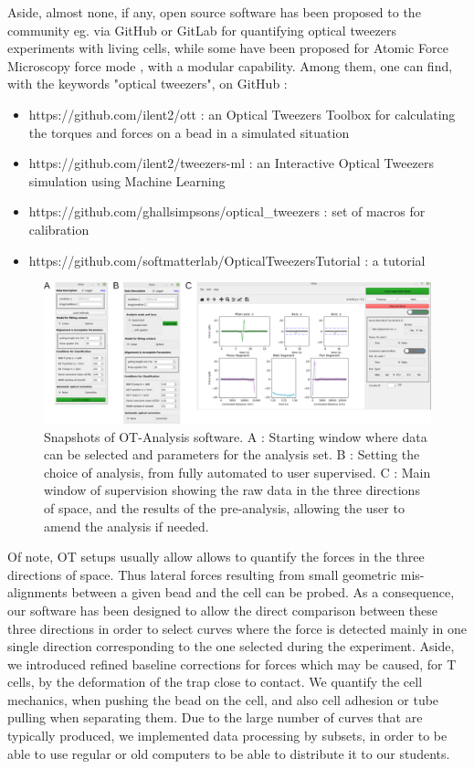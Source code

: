 \documentclass[a4paper]{article}
\begin{document}
Aside, almost none, if any, open source software has been proposed to
the community eg. via GitHub or GitLab for quantifying optical tweezers
experiments with living cells, while some have been proposed for Atomic
Force Microscopy force mode \cite{muller_nanite_2019}, with a modular
capability. Among them, one can find, with the keywords "optical tweezers", on GitHub :
\begin{itemize}
\item https://github.com/ilent2/ott : an Optical Tweezers Toolbox for calculating the torques and forces on a bead in a simulated situation
\item https://github.com/ilent2/tweezers-ml  : an Interactive Optical Tweezers simulation using Machine Learning
\item https://github.com/ghallsimpsons/optical\_tweezers  : set of macros for calibration
\item https://github.com/softmatterlab/OpticalTweezersTutorial : a tutorial
\end{itemize}

\begin{figure}[h]
	\centering
	\includegraphics[width=\linewidth]{dessin}
	\caption{Snapshots of OT-Analysis software. A : Starting window where data can be selected and parameters for the analysis set. B : Setting the choice of analysis, from fully automated to user supervised. C : Main window of supervision showing the raw data in the three directions of space, and the results of the pre-analysis, allowing the user to amend the analysis if needed.}
	\label{fig:dessin}
\end{figure}


Of note, OT setups usually allow allows to quantify the forces in the three directions
of space. Thus lateral forces resulting from small geometric mis-alignments
between a given bead and the cell can be probed. As a consequence,
our software has been designed to allow the direct comparison between
these three directions in order to select curves where the force is
detected mainly in one single direction corresponding to the one
selected during the experiment. Aside, we introduced refined baseline
corrections for forces which may be caused, for T cells, by the
deformation of the trap close to contact. We quantify the cell
mechanics, when pushing the bead on the cell, and also cell adhesion or
tube pulling when separating them. Due to the large number of curves
that are typically produced, we implemented data processing by subsets,
in order to be able to use regular or old computers to be able to
distribute it to our students.
\end{document}
